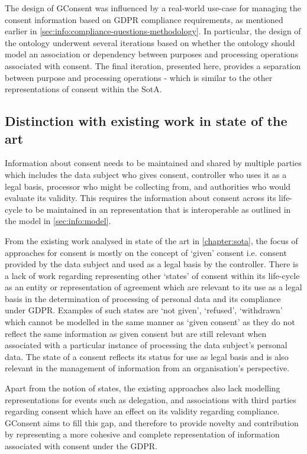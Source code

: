 The design of GConsent was influenced by a real-world use-case for managing the consent information based on GDPR compliance requirements, as mentioned earlier in \autoref{sec:info:compliance-questions-methodology}.
In particular, the design of the ontology underwent several iterations based on whether the ontology should model an association or dependency between purposes and processing operations associated with consent. The final iteration, presented here, provides a separation between purpose and processing operations - which is similar to the other representations of consent within the SotA.

\subsection{Distinction with existing work in state of the art}
Information about consent needs to be maintained and shared by multiple parties which includes the data subject who gives consent, controller who uses it as a legal basis, processor who might be collecting from, and authorities who would evaluate its validity. This requires the information about consent across its life-cycle to be maintained in an representation that is interoperable as outlined in the model in \autoref{sec:info:model}.

From the existing work analysed in state of the art in \autoref{chapter:sota}, the focus of approaches for consent is mostly on the concept of `given' consent i.e. consent provided by the data subject and used as a legal basis by the controller. There is a lack of work regarding representing other `states' of consent within its life-cycle as an entity or representation of agreement which are relevant to its use as a legal basis in the determination of processing of personal data and its compliance under GDPR.
Examples of such states are `not given', `refused', `withdrawn' which cannot be modelled in the same manner as `given consent' as they do not reflect the same information as given consent but are still relevant when associated with a particular instance of processing the data subject's personal data. The state of a consent reflects its status for use as legal basis and is also relevant in the management of information from an organisation's perspective.

Apart from the notion of states, the existing approaches also lack modelling representations for events such as delegation, and associations with third parties regarding consent which have an effect on its validity regarding compliance.
GConsent aims to fill this gap, and therefore to provide novelty and contribution by representing a more cohesive and complete representation of information associated with consent under the GDPR.

